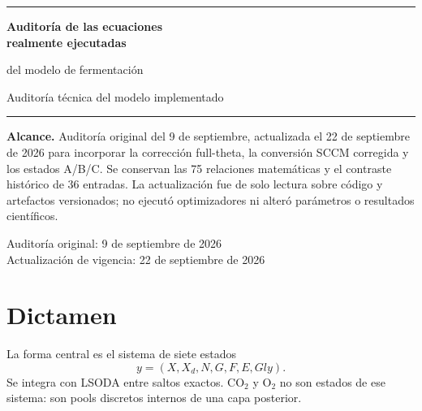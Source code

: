 \documentclass[11pt]{article}
\begin{document}
\begin{titlepage}
  \thispagestyle{empty}
  \centering
  \vspace*{2.0cm}
  {\color{auditblue}\rule{0.82\textwidth}{0.9pt}}\par
  \vspace{1.25cm}
  {\sffamily\bfseries\LARGE Auditoría de las ecuaciones\\[0.28em]
   realmente ejecutadas}\par
  \vspace{0.55cm}
  {\Large del modelo de fermentación}\par
  \vspace{1.0cm}
  {\color{auditslate}\large Auditoría técnica del modelo implementado}\par
  \vspace{1.25cm}
  {\color{auditblue}\rule{0.82\textwidth}{0.9pt}}\par

  \vfill
  \begin{minipage}{0.82\textwidth}
    \small
    \textbf{Alcance.} Auditoría original del 9 de septiembre, actualizada el
    22 de septiembre de 2026 para incorporar la corrección full-theta, la
    conversión SCCM corregida y los estados A/B/C. Se conservan las 75
    relaciones matemáticas y el contraste histórico de 36 entradas. La
    actualización fue de solo lectura sobre código y artefactos versionados;
    no ejecutó optimizadores ni alteró parámetros o resultados científicos.
  \end{minipage}

  \vfill
  {\sffamily\color{auditslate}Auditoría original: 9 de septiembre de 2026\\
   Actualización de vigencia: 22 de septiembre de 2026}\par
  \vspace{0.4cm}
\end{titlepage}

\pagestyle{plain}
\tableofcontents
\clearpage
{}
\pagestyle{fancy}

\section{Dictamen}

La forma central es el sistema de siete estados
\begin{equation}
 y=(X,X_d,N,G,F,E,Gly).
\end{equation}
Se integra con LSODA entre saltos exactos. CO$_2$ y O$_2$ no son estados de
ese sistema: son pools discretos internos de una capa posterior.
\end{document}

